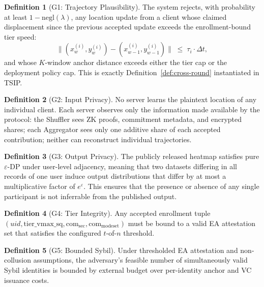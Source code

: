 \documentclass[conference]{IEEEtran}
\theoremstyle{definition}
\newtheorem{definition}{Definition}
\theoremstyle{plain}
\begin{document}
\begin{definition}[G1: Trajectory Plausibility]\label{def:g1}
The system rejects, with probability at least $1 - \mathrm{negl}(\lambda)$,
any location update from a client whose claimed displacement since
the previous accepted update exceeds the enrollment-bound tier speed:
\begin{equation}
  \|(x_{w}^{(i)}, y_{w}^{(i)}) - (x_{w-1}^{(i)}, y_{w-1}^{(i)})\|
  \;\leq\; \tau_i \cdot \Delta t,
\end{equation}
and whose $K$-window anchor distance exceeds either the tier cap or
the deployment policy cap. This is exactly
Definition~\ref{def:cross-round} instantiated in TSIP.
\end{definition}

\begin{definition}[G2: Input Privacy]\label{def:g2}
No server learns the plaintext location of any individual client.
Each server observes only the information made available by the
protocol: the Shuffler sees ZK proofs, commitment metadata, and
encrypted shares; each Aggregator sees only one additive share of
each accepted contribution; neither can reconstruct individual
trajectories.
\end{definition}

\begin{definition}[G3: Output Privacy]\label{def:g3}
The publicly released heatmap satisfies pure $\varepsilon$-DP under
user-level adjacency, meaning that two datasets differing in all records
of one user induce output distributions that differ by at most a
multiplicative factor of $e^{\varepsilon}$. This ensures that the presence
or absence of any single participant is not inferrable from the
published output.
\end{definition}

\begin{definition}[G4: Tier Integrity]\label{def:g4}
Any accepted enrollment tuple
$(uid,\mathrm{tier\_vmax\_sq},\mathrm{com}_{\mathrm{sec}},\mathrm{com}_{\mathrm{modeset}})$
must be bound to a valid EA attestation set that satisfies the configured
$t$-of-$n$ threshold.
\end{definition}

\begin{definition}[G5: Bounded Sybil]\label{def:g5}
Under thresholded EA attestation and non-collusion assumptions,
the adversary's feasible number of simultaneously valid Sybil identities is
bounded by external budget over per-identity anchor and VC issuance costs.
\end{definition}
\end{document}
